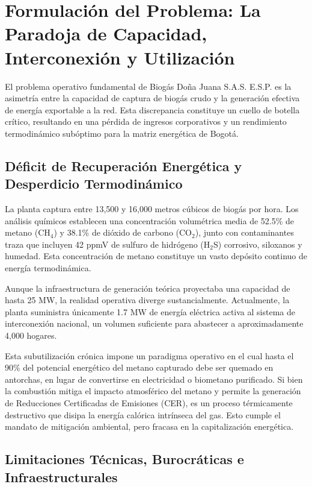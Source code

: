 \documentclass[11pt,letterpaper]{article}
\begin{document}
\newpage

\section{Formulación del Problema: La Paradoja de Capacidad, Interconexión y
Utilización}

El problema operativo fundamental de Biogás Doña Juana
S.A.S. E.S.P. es la asimetría entre la capacidad de captura de biogás
crudo y la generación efectiva de energía exportable a la red. Esta
discrepancia constituye un cuello de botella crítico, resultando en una
pérdida de ingresos corporativos y un rendimiento termodinámico subóptimo
para la matriz energética de Bogotá.

\subsection{Déficit de Recuperación Energética y Desperdicio Termodinámico}

La planta captura entre 13,500 y 16,000 metros cúbicos de biogás por hora. Los
análisis químicos establecen una concentración volumétrica media de 52.5\% de
metano (CH$_4$) y 38.1\% de dióxido de carbono (CO$_2$), junto con contaminantes
traza que incluyen 42 ppmV de sulfuro de hidrógeno (H$_2$S) corrosivo, siloxanos
y humedad. Esta concentración de metano constituye un vasto depósito continuo de
energía termodinámica.

Aunque la infraestructura de generación teórica proyectaba una capacidad
de hasta 25 MW, la realidad operativa diverge sustancialmente.
Actualmente, la planta suministra únicamente 1.7 MW de energía eléctrica
activa al sistema de interconexión nacional, un volumen suficiente para
abastecer a aproximadamente 4,000 hogares.

Esta subutilización crónica impone un paradigma operativo en el cual hasta
el 90\% del potencial energético del metano capturado debe ser quemado en
antorchas, en lugar de convertirse en electricidad o biometano purificado.
Si bien la combustión mitiga el impacto atmosférico del metano y permite
la generación de Reducciones Certificadas de Emisiones (CER), es un
proceso térmicamente destructivo que disipa la energía calórica intrínseca
del gas. Esto cumple el mandato de mitigación ambiental, pero fracasa en
la capitalización energética.

\subsection{Limitaciones Técnicas, Burocráticas e Infraestructurales}
\end{document}
